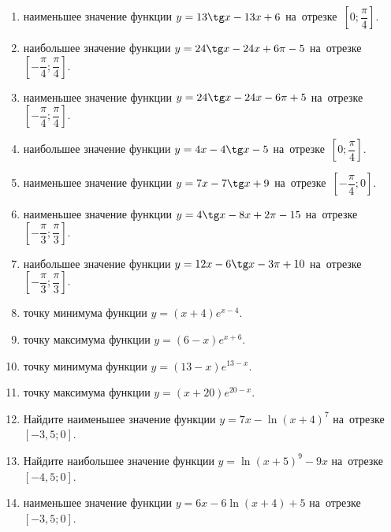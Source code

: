 \documentclass[a4paper,10pt]{article}
\begin{document}
\begin{enumerate}
\item {} наименьшее значение функции $y=13\tg x-13x+6$ на~отрезке~$\left[0;\dfrac{\pi }{4}\right]$.

\item {} наибольшее значение функции $y=24\tg x-24x+6\pi -5$ на~отрезке~$\left[-\dfrac{\pi }{4};\dfrac{\pi }{4}\right]$.

\item {} наименьшее значение функции $y=24\tg x-24x-6\pi +5$ на~отрезке~$\left[-\dfrac{\pi }{4};\dfrac{\pi }{4}\right]$.

\item {} наибольшее значение функции $y=4x-4\tg x-5$ на~отрезке~$\left[0;\dfrac{\pi }{4}\right]$.

\item {} наименьшее значение функции $y=7x-7\tg x+9$ на~отрезке~$\left[-\dfrac{\pi }{4};0\right]$.

\item {} наименьшее значение функции $y=4\tg x-8x+2\pi -15$ на~отрезке~$\left[-\dfrac{\pi }{3};\dfrac{\pi }{3}\right]$.

\item {} наибольшее значение функции $y=12x-6\tg x-3\pi +10$ на~отрезке~$\left[-\dfrac{\pi }{3};\dfrac{\pi }{3}\right]$.

\item {} точку минимума функции $y=\left(x+4\right)e^{x-4}$.

\item {} точку максимума функции $y=\left(6-x\right)e^{x+6}$.

\item {} точку минимума функции $y=\left(13-x\right)e^{13-x}$.

\item {} точку максимума функции $y=\left(x+20\right)e^{20-x}$.

\item Найдите наименьшее значение функции $y=7x-\ln \left(x+4\right)^7$ на~отрезке~$\left[-3,5;0\right]$.

\item Найдите наибольшее значение функции $y=\ln \left(x+5\right)^9-9x$ на~отрезке~$\left[-4,5;0\right]$.

\item {} наименьшее значение функции $y=6x-6\ln \left(x+4\right)+5$ на~отрезке~$\left[-3,5;0\right]$.


\end{enumerate}
\end{document}
